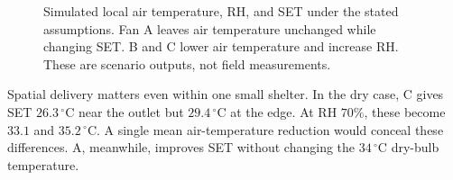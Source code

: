 \documentclass[12pt]{article}
\begin{document}
\begin{figure}[!ht]

\caption{Simulated local air temperature, RH, and SET under the stated assumptions. Fan A leaves air temperature unchanged while changing SET. B and C lower air temperature and increase RH. These are scenario outputs, not field measurements.}
\label{fig:bus-local}
\end{figure}

Spatial delivery matters even within one small shelter. In the dry case, C gives SET $26.3\,^{\circ}\mathrm C$ near the outlet but $29.4\,^{\circ}\mathrm C$ at the edge. At RH $70\%$, these become $33.1$ and $35.2\,^{\circ}\mathrm C$. A single mean air-temperature reduction would conceal these differences. A, meanwhile, improves SET without changing the $34\,^{\circ}\mathrm C$ dry-bulb temperature.
\end{document}
